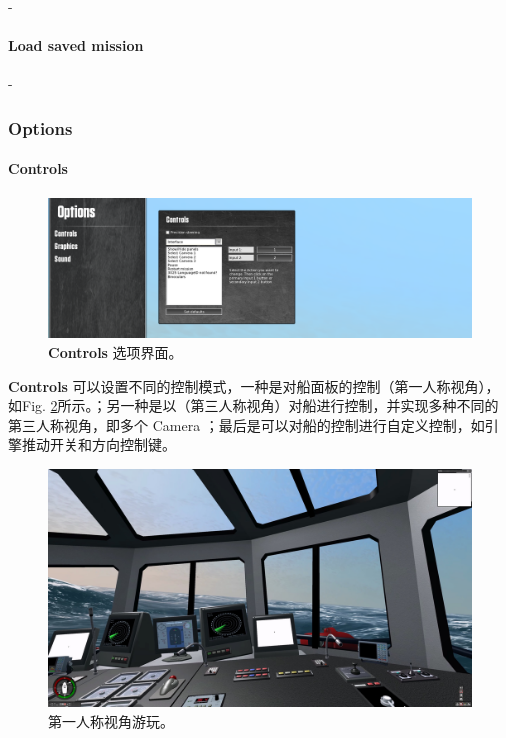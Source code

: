\documentclass[letterpaper,10pt]{article}
\begin{document}
				-
				
				\paragraph{Load saved mission}
				
				-
				
				\subsubsection{Options}
				
					\paragraph{Controls}
					
					\begin{figure}[htbp]
						\centering 
						\includegraphics[width=\columnwidth]{picture/Options_Controls}
						\caption{
							\label{fig: Options_Controls} 
							\textbf{Controls} 选项界面。
						}	
					\end{figure}
					
					\textbf{Controls} 可以设置不同的控制模式，一种是对船面板的控制（第一人称视角），如Fig. \ref{fig: First-person perspective}所示。；另一种是以（第三人称视角）对船进行控制，并实现多种不同的第三人称视角，即多个 Camera ；最后是可以对船的控制进行自定义控制，如引擎推动开关和方向控制键。
					
					\begin{figure}[htbp]
						\centering
						\includegraphics[width=\columnwidth]{picture/First-person perspective}
						\caption{
							\label{fig: First-person perspective} 
							第一人称视角游玩。
						}	
					\end{figure}
					
\end{document}
